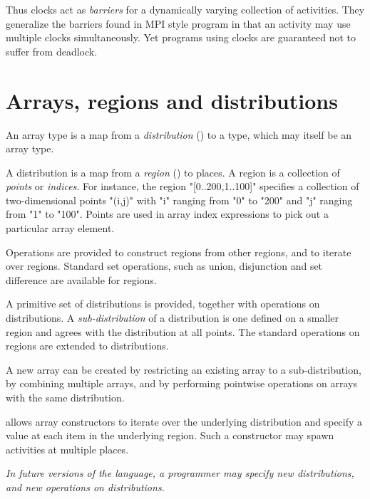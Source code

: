 Thus clocks act as \emph{barriers} for a dynamically varying collection
of activities. They generalize the barriers found in MPI style program
in that an activity may use multiple clocks simultaneously. Yet
programs using clocks are guaranteed not to suffer from
deadlock.


\section{Arrays, regions and distributions}

An \Xten{} array type is a map from a \emph{distribution}
() to a type, which may itself be an
array type.

A distribution is a map from a \emph{region} () to
places.  A region is a collection of \emph{points} or
\emph{indices}. For instance, the region \xcd"[0..200,1..100]" specifies
a collection of two-dimensional points \xcd"(i,j)" with
\xcd"i" ranging from \xcd"0" to \xcd"200" and \xcd"j" ranging
from \xcd"1" to \xcd"100". Points are used in array index expressions
to pick out a particular array element.

Operations are provided to construct regions from other regions, and
to iterate over regions. Standard set operations, such as union,
disjunction and set difference are available for regions.

A primitive set of distributions is provided, together with operations
on distributions. A \emph{sub-distribution} of a distribution is one
defined on a smaller region and agrees with the distribution
at all points.  The standard operations on regions are extended to
distributions.


A new array can be created by restricting an existing array to a
sub-distribution, by combining multiple arrays, and by performing
pointwise operations on arrays with the same distribution.

\Xten{} allows array constructors to iterate over the underlying
distribution and specify a value at each item in the underlying
region. Such a constructor may spawn activities at multiple places.

\emph{In future versions of the language, a programmer may specify new
distributions, and new operations on distributions.}

